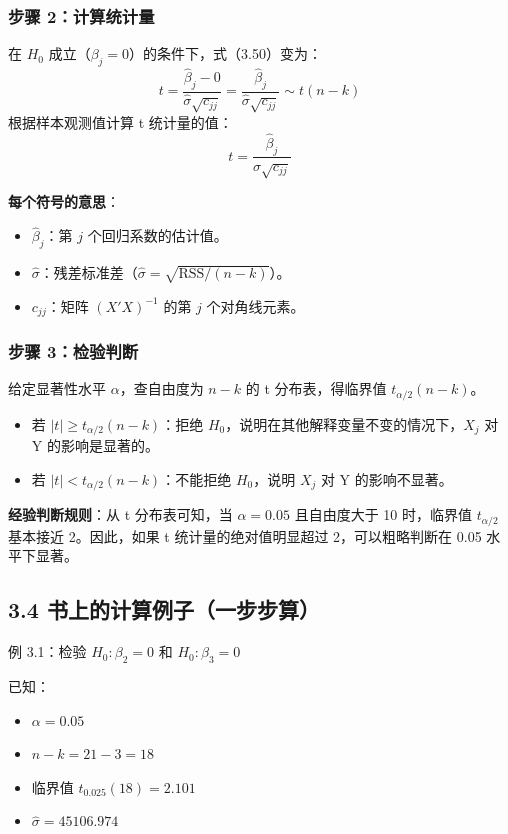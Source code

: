 \documentclass[12pt,a4paper]{ctexart}
\begin{document}
\subsubsection{步骤 2：计算统计量}
在 \(H_0\) 成立（\(\beta_j = 0\)）的条件下，式（3.50）变为：
\begin{equation}
t = \frac{\hat{\beta}_j - 0}{\hat{\sigma}\sqrt{c_{jj}}} = \frac{\hat{\beta}_j}{\hat{\sigma}\sqrt{c_{jj}}} \sim t(n-k) \tag{3.51}
\end{equation}
根据样本观测值计算 t 统计量的值：
\begin{equation}
t = \frac{\hat{\beta}_j}{\hat{\sigma}\sqrt{c_{jj}}} \tag{3.52}
\end{equation}

\textbf{每个符号的意思}：
\begin{itemize}
    \item \(\hat{\beta}_j\)：第 \(j\) 个回归系数的估计值。
    \item \(\hat{\sigma}\)：残差标准差（\(\hat{\sigma} = \sqrt{\text{RSS}/(n-k)}\)）。
    \item \(c_{jj}\)：矩阵 \((X'X)^{-1}\) 的第 \(j\) 个对角线元素。
\end{itemize}

\subsubsection{步骤 3：检验判断}
给定显著性水平 \(\alpha\)，查自由度为 \(n-k\) 的 t 分布表，得临界值 \(t_{\alpha/2}(n-k)\)。
\begin{itemize}
    \item 若 \(|t| \geq t_{\alpha/2}(n-k)\)：拒绝 \(H_0\)，说明在其他解释变量不变的情况下，\(X_j\) 对 Y 的影响是显著的。
    \item 若 \(|t| < t_{\alpha/2}(n-k)\)：不能拒绝 \(H_0\)，说明 \(X_j\) 对 Y 的影响不显著。
\end{itemize}

\textbf{经验判断规则}：从 t 分布表可知，当 \(\alpha = 0.05\) 且自由度大于 10 时，临界值 \(t_{\alpha/2}\) 基本接近 2。因此，如果 t 统计量的绝对值明显超过 2，可以粗略判断在 0.05 水平下显著。

\subsection{3.4 书上的计算例子（一步步算）}

例 3.1：检验 \(H_0: \beta_2 = 0\) 和 \(H_0: \beta_3 = 0\)

已知：
\begin{itemize}
    \item \(\alpha = 0.05\)
    \item \(n - k = 21 - 3 = 18\)
    \item 临界值 \(t_{0.025}(18) = 2.101\)
    \item \(\hat{\sigma} = 45106.974\)
\end{itemize}
\end{document}

